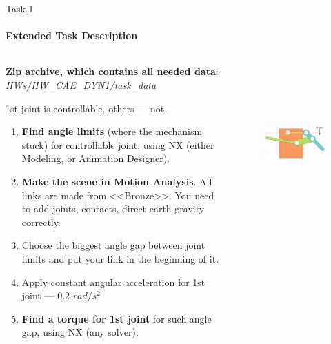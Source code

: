 \documentclass[aspectratio=169]{beamer}
\begin{document}
\begin{frame}[t]{Task 1}
    \framesubtitle{Extended Task Description}
    \vspace{-0.6cm}
    \begin{columns}[T,onlytextwidth]
        \begin{column}{0.59\textwidth}
            \scriptsize
            \textbf{Zip archive, which contains all needed data}: \textit{HWs/HW\_CAE\_DYN1/task\_data}

            1st joint is controllable, others --- not.
            \vspace{-0.1cm}
            \begin{enumerate}
                \item \textbf{Find angle limits} (where the mechanism stuck) for controllable joint, using NX (either Modeling, or Animation Designer).
                \item \textbf{Make the scene in Motion Analysis}. All links are made from <<Bronze>>. You need to add joints, contacts, direct earth gravity correctly.
                \item Choose the biggest angle gap between joint limits and put your link in the beginning of it.
                \item Apply constant angular acceleration for 1st joint --- 0.2 $rad / s^2$
                \item \textbf{Find a torque for 1st joint} for such angle gap, using NX (any solver):
            \end{enumerate}
        \end{column}
        \begin{column}{0.39\textwidth}
            \vspace{1cm}
            \begin{figure}[H]
                \centering\includegraphics[height=6cm,width=1\textwidth,keepaspectratio]{task_descr.png}
                \label{fig:task_descr.png}
            \end{figure}
        \end{column}
    \end{columns}
\end{frame}
\end{document}
